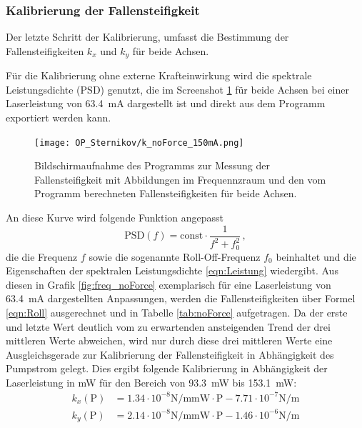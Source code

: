         \newpage
        \subsubsection{Kalibrierung der Fallensteifigkeit}
            Der letzte Schritt der Kalibrierung, umfasst die Bestimmung der Fallensteifigkeiten $k_x$ und $k_y$ für beide Achsen.
            
            Für die Kalibrierung ohne externe Krafteinwirkung wird die spektrale Leistungsdichte (PSD) genutzt, die im Screenshot \ref{fig:PSD} für beide Achsen bei einer Laserleistung von 
            \SI{63.4}{\milli\ampere} dargestellt ist und direkt aus dem Programm exportiert werden kann. 
            \begin{figure}[h]
            \centering
            \texttt{[image: OP\_Sternikov/k\_noForce\_150mA.png]}
            \caption{Bildschirmaufnahme des Programms zur Messung der Fallensteifigkeit mit Abbildungen im Frequennzraum und den vom Programm berechneten Fallensteifigkeiten für beide Achsen.}
            \label{fig:PSD}
            \end{figure}
            \FloatBarrier
            An diese Kurve wird folgende Funktion angepasst
            \begin{equation*}
                \text{PSD}(f) = \text{const} \cdot \frac{1}{f^2+f_0^2} \, ,
            \end{equation*}
            die die Frequenz $f$ sowie die sogenannte Roll-Off-Frequenz $f_0$ beinhaltet und die Eigenschaften der spektralen Leistungsdichte \ref{eqn:Leistung} wiedergibt. Aus diesen in Grafik 
            \ref{fig:freq_noForce} exemplarisch für eine Laserleistung von \SI{63.4}{\milli\ampere} dargestellten Anpassungen, werden die Fallensteifigkeiten über Formel \ref{eqn:Roll} ausgerechnet und in Tabelle
            \ref{tab:noForce} aufgetragen. Da der erste und letzte Wert deutlich vom zu erwartenden ansteigenden Trend der drei mittleren Werte abweichen, wird nur durch diese drei mittleren Werte eine Ausgleichsgerade zur 
            Kalibrierung der Fallensteifigkeit in Abhängigkeit des Pumpstrom gelegt. Dies ergibt folgende Kalibrierung in Abhängigkeit der Laserleistung in \si{\milli\watt} für den Bereich 
            von \SI{93.3}{\milli\watt} bis \SI{153.1}{\milli\watt}:
            \begin{align}
                k_x(\text{P}) &= 1.34\cdot10^{-8}\si{\newton\per\metre\milli\watt} \cdot \text{P} - 7.71\cdot10^{-7}\si{\newton\per\metre} \\
                k_y(\text{P}) &= 2.14\cdot10^{-8}\si{\newton\per\metre\milli\watt} \cdot \text{P} - 1.46\cdot10^{-6}\si{\newton\per\metre}
            \end{align}
